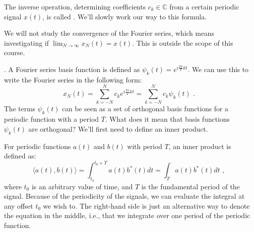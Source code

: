 The inverse operation, determining coefficients $c_k \in \mathbb{C}$ from a certain
periodic signal $x(t)$, is called \emph{}.
We'll slowly work our way to this formula.

We will not study the convergence of the Fourier series, which means investigating
if $\lim_{N\rightarrow \infty} x_N(t) = x(t)$. This is outside the scope of this course.

. A Fourier series basis function is defined
as $\psi_k(t)=e^{i\frac{2\pi}{T} k t}$.
We can use this to write the Fourier series in the following form:
\begin{equation}
  x_N(t) = \sum_{k=-N}^{N} c_k e^{i \frac{2\pi}{T} k t} = \sum_{k=-N}^{N} c_k \psi_k(t) \,\,.
\end{equation}
The terms $\psi_k(t)$ can be seen as a set of orthogonal basis
functions for a periodic function with a period $T$. What does it mean
that basis functions $\psi_k(t)$ are orthogonal?  We'll first need to
define an inner product.





For periodic functions $a(t)$ and $b(t)$ with period $T$, an inner product is defined as:
\begin{equation}
  \langle a(t), b(t) \rangle = \int_{t_0}^{t_0+T} a(t) b^*(t) dt = \int_T a(t) b^*(t) dt \,\,,
  \label{eq:inner_product_def}
\end{equation}
where $t_0$ is an arbitrary value of time, and $T$ is the fundamental period of the signal.
Because of the periodicity of the signals, we can evaluate the integral at any offset $t_0$ we wish to.
The right-hand side is just an alternative way to denote the equation in the middle, i.e.,
that we integrate over one period of the periodic function.

